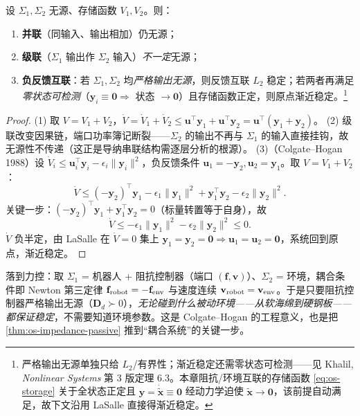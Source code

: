 \begin{theorem}[无源系统互联]
\label{thm:os-interconnect}
设 $\Sigma_1,\Sigma_2$ 无源、存储函数 $V_1,V_2$。则：
\begin{enumerate}
  \item \textbf{并联}（同输入、输出相加）仍无源；
  \item \textbf{级联}（$\Sigma_1$ 输出作 $\Sigma_2$ 输入）\emph{不一定}无源；
  \item \textbf{负反馈互联}：若 $\Sigma_1,\Sigma_2$ 均\emph{严格输出无源}，则反馈互联 $L_2$ 稳定；若两者再满足\emph{零状态可检测}（$\mathbf y_i\equiv\mathbf 0\Rightarrow$ 状态 $\to\mathbf 0$）且存储函数正定，则原点渐近稳定。\footnote{严格输出无源单独只给 $L_2$/有界性；渐近稳定还需零状态可检测——见 Khalil, \emph{Nonlinear Systems} 第 3 版定理 6.3。本章阻抗/环境互联的存储函数 \cref{eq:os-storage} 关于全状态正定且 $\mathbf y=\dot{\tilde{\mathbf x}}\equiv\mathbf 0$ 经动力学迫使 $\tilde{\mathbf x}\to\mathbf 0$，该前提自动满足，故下文沿用 LaSalle 直接得渐近稳定。}
\end{enumerate}
\end{theorem}
\begin{proof}
(1) 取 $V=V_1+V_2$，$\dot V=\dot V_1+\dot V_2\le\mathbf u^\top\mathbf y_1+\mathbf u^\top\mathbf y_2=\mathbf u^\top(\mathbf y_1+\mathbf y_2)$。
(2) 级联改变因果链，端口功率簿记断裂——$\Sigma_2$ 的输出不再与 $\Sigma_1$ 的输入直接挂钩，故无源性不传递（这正是导纳串联结构需逐层分析的根源）。
(3)（Colgate--Hogan 1988\cite{colgate1988robust}）设 $\dot V_i\le\mathbf u_i^\top\mathbf y_i-\epsilon_i\|\mathbf y_i\|^2$，负反馈条件 $\mathbf u_1=-\mathbf y_2,\mathbf u_2=\mathbf y_1$。取 $V=V_1+V_2$：
\[
  \dot V\le(-\mathbf y_2)^\top\mathbf y_1-\epsilon_1\|\mathbf y_1\|^2+\mathbf y_1^\top\mathbf y_2-\epsilon_2\|\mathbf y_2\|^2.
\]
关键一步：$(-\mathbf y_2)^\top\mathbf y_1+\mathbf y_1^\top\mathbf y_2=0$（标量转置等于自身），故
\begin{equation}
  \dot V\le-\epsilon_1\|\mathbf y_1\|^2-\epsilon_2\|\mathbf y_2\|^2\le0.
  \label{eq:os-feedback-stable}
\end{equation}
$\dot V$ 负半定，由 LaSalle 在 $\dot V=0$ 集上 $\mathbf y_1=\mathbf y_2=\mathbf 0\Rightarrow\mathbf u_1=\mathbf u_2=\mathbf 0$，系统回到原点，渐近稳定。
\end{proof}

落到力控：取 $\Sigma_1$ = 机器人 + 阻抗控制器（端口 $(\mathbf f,\mathbf v)$）、$\Sigma_2$ = 环境，耦合条件即 Newton 第三定律 $\mathbf f_{\rm robot}=-\mathbf f_{\rm env}$ 与速度连续 $\mathbf v_{\rm robot}=\mathbf v_{\rm env}$。于是只要阻抗控制器严格输出无源（$\mathbf D_d\succ0$），\emph{无论碰到什么被动环境——从软海绵到硬钢板——都保证稳定}，不需要知道环境参数。这是 Colgate--Hogan 的工程意义，也是把 \cref{thm:os-impedance-passive} 推到“耦合系统”的关键一步。

